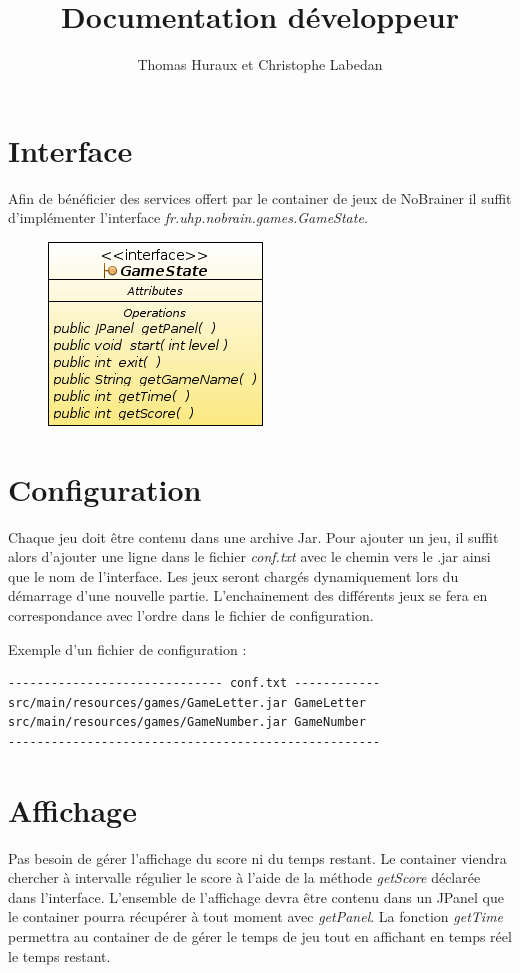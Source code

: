 \documentclass[a4paper,12pt]{article} %
\title{Documentation d\'eveloppeur}
\author{Thomas Huraux et Christophe Labedan}
\date{}
\begin{document}
\maketitle

\section*{Interface}
Afin de b\'en\'eficier des services offert par le container de jeux de NoBrainer il suffit d'impl\'ementer l'interface \emph{fr.uhp.nobrain.games.GameState}. 

\begin{figure}[htbp]
\centering
 \includegraphics[width=.25\linewidth]{GameStateInterfaceDiagram.png}
\end{figure}

\section*{Configuration}
Chaque jeu doit \^etre contenu dans une archive Jar. Pour ajouter un jeu, il suffit alors d'ajouter une ligne dans le fichier \emph{conf.txt} avec le chemin vers le .jar ainsi que le nom de l'interface. Les jeux seront charg\'es dynamiquement lors du d\'emarrage d'une nouvelle partie. L'enchainement des diff\'erents jeux se fera en correspondance avec l'ordre dans le fichier de configuration.

Exemple d'un fichier de configuration :
\begin{center}
 \begin{verbatim}
------------------------------ conf.txt ------------
src/main/resources/games/GameLetter.jar GameLetter
src/main/resources/games/GameNumber.jar GameNumber
----------------------------------------------------
 \end{verbatim}
\end{center}

\section*{Affichage}
Pas besoin de g\'erer l'affichage du score ni du temps restant. Le container viendra chercher \`a intervalle r\'egulier le score \`a l'aide de la m\'ethode \emph{getScore} d\'eclar\'ee dans l'interface. L'ensemble de l'affichage devra \^etre contenu dans un JPanel que le container pourra r\'ecup\'erer \`a tout moment avec \emph{getPanel}. La fonction \emph{getTime} permettra au container de de g\'erer le temps de jeu tout en affichant en temps r\'eel le temps restant.
\end{document}
